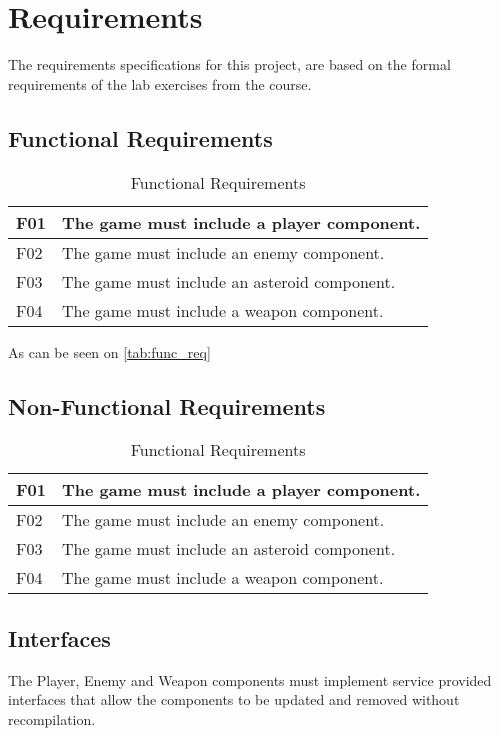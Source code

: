 \section{Requirements}
The requirements specifications for this project, are based on the formal requirements of
the lab exercises from the course.

\subsection{Functional Requirements}
\begin{table}[H]
    \begin{center}
        \begin{tabulary}{1.0\textwidth}{l | L}
            \toprule
            F01 & The game must include a player component. \\
            \midrule
            F02 & The game must include an enemy component. \\
            \midrule
            F03 & The game must include an asteroid component. \\
            \midrule
            F04 & The game must include a weapon component. \\
            \bottomrule
        \end{tabulary}
    \end{center}
    \caption{Functional Requirements}
    \label{tab:func_req}
\end{table}

As can be seen on \autoref{tab:func_req}

\subsection{Non-Functional Requirements}
\begin{table}[H]
    \begin{center}
        \begin{tabulary}{1.0\textwidth}{l | L}
            \toprule
            F01 & The game must include a player component. \\
            \midrule
            F02 & The game must include an enemy component. \\
            \midrule
            F03 & The game must include an asteroid component. \\
            \midrule
            F04 & The game must include a weapon component. \\
            \bottomrule
        \end{tabulary}
    \end{center}
    \caption{Functional Requirements}
    \label{tab:nfunc_req}
\end{table}
\subsection{Interfaces}


The Player, Enemy and Weapon components must implement service provided 
interfaces that allow the components to be updated and removed without 
recompilation.